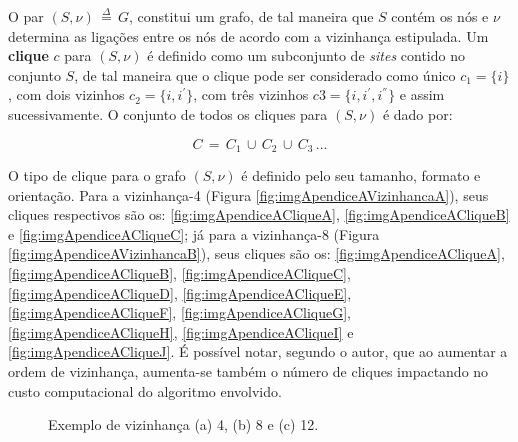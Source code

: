 O par  $(S,\nu) \, \overset{\Delta}{=} \, G $, constitui um grafo, de tal maneira que $S$ contém os nós e $\nu$ determina as ligações entre os nós de acordo com a vizinhança estipulada. Um \textbf{clique} $c$ para $(S,\nu)$ é definido como um subconjunto de \textit{sites} contido no conjunto $S$, de tal maneira que o clique pode ser considerado como único $c_{1} = \{i\}$, com dois vizinhos $c_{2} = \{i,i^{'}\}$, com três vizinhos $c{3} = \{i,i^{'},i^{''}\}$ e assim sucessivamente. O conjunto de todos os cliques para $(S,\nu)$ é dado por:

\begin{equation}
	C \,=\, C_{1} \,\cup\, C_{2}\, \cup \,C_{3}\,...
	\label{eq:eqApendiceAConjuntoCliques}
\end{equation}  

O tipo de clique para o grafo $(S,\nu)$ é definido pelo seu tamanho, formato e orientação. Para a vizinhança-4 (Figura \ref{fig:imgApendiceAVizinhancaA}), seus cliques respectivos são os: \ref{fig:imgApendiceACliqueA}, \ref{fig:imgApendiceACliqueB} e \ref{fig:imgApendiceACliqueC}; já para a vizinhança-8 (Figura \ref{fig:imgApendiceAVizinhancaB}), seus cliques são os: \ref{fig:imgApendiceACliqueA}, \ref{fig:imgApendiceACliqueB}, \ref{fig:imgApendiceACliqueC}, \ref{fig:imgApendiceACliqueD}, \ref{fig:imgApendiceACliqueE}, \ref{fig:imgApendiceACliqueF}, \ref{fig:imgApendiceACliqueG}, \ref{fig:imgApendiceACliqueH}, \ref{fig:imgApendiceACliqueI} e \ref{fig:imgApendiceACliqueJ}. É possível notar, segundo o autor, que ao aumentar a ordem de vizinhança, aumenta-se também o número de cliques impactando no custo computacional do algoritmo envolvido.  

\begin{figure}[H]
	\centering
	
	\caption{Exemplo de vizinhança (a) 4, (b) 8 e (c) 12.}
	
	
	\label{fig:imgApendiceAVizinhanca}
\end{figure}


